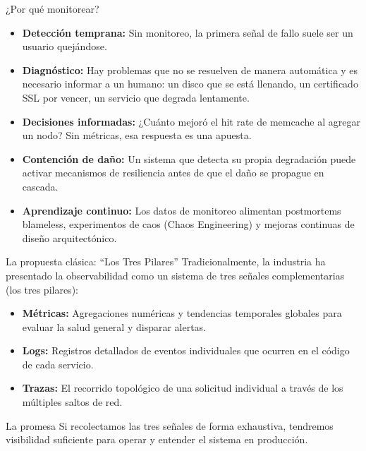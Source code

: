 \documentclass[institutional,screen,none]{../cls/ua-engineering-v6-beamer}
\begin{document}
\begin{frame}{¿Por qué monitorear?}
\begin{itemize}
\item \textbf{Detección temprana:} Sin monitoreo, la primera señal de fallo suele ser un usuario quejándose.
\item \textbf{Diagnóstico:} Hay problemas que no se resuelven de manera automática y es necesario informar a un humano: un disco que se está llenando, un certificado SSL por vencer, un servicio que degrada lentamente.
\item \textbf{Decisiones informadas:} ¿Cuánto mejoró el hit rate de memcache al agregar un nodo? Sin métricas, esa respuesta es una apuesta.
\item \textbf{Contención de daño:} Un sistema que detecta su propia degradación puede activar
mecanismos de resiliencia antes de que el daño se propague en cascada.
\item \textbf{Aprendizaje continuo:} Los datos de monitoreo alimentan postmortems blameless, experimentos de caos (Chaos Engineering) y mejoras continuas de diseño arquitectónico.
\end{itemize}
\end{frame}

\begin{frame}{La propuesta clásica: ``Los Tres Pilares''}
Tradicionalmente, la industria ha presentado la observabilidad como un sistema de tres señales complementarias (los tres pilares):

\begin{itemize}
\item \textbf{Métricas:} Agregaciones numéricas y tendencias temporales globales para evaluar la salud general y disparar alertas.
\item \textbf{Logs:} Registros detallados de eventos individuales que ocurren en el código de cada servicio.
\item \textbf{Trazas:} El recorrido topológico de una solicitud individual a través de los múltiples saltos de red.
\end{itemize}
\pause

\begin{block}{La promesa}
Si recolectamos las tres señales de forma exhaustiva, tendremos visibilidad suficiente para operar y entender el sistema en producción.
\end{block}
\end{frame}
\end{document}
